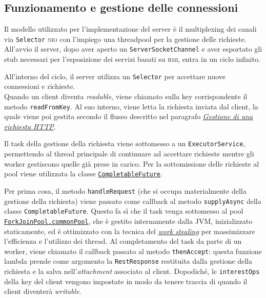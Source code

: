 \documentclass[a4paper,8pt]{article} %
\def\code#1{\texttt{#1}}
\begin{document}
\subsection{Funzionamento e gestione delle connessioni}
Il modello utilizzato per l'implementazione del server è il multiplexing dei canali via \code{Selector} \textsc{nio} con l'impiego una threadpool per la gestione delle richieste.
All'avvio il server, dopo aver aperto un \code{ServerSocketChannel} e aver esportato gli stub necessari per l'esposizione dei servizi basati su \textsc{rmi},
entra in un ciclo infinito.
\par All'interno del ciclo, il server utilizza un \code{Selector} per accettare nuove connessioni e richieste.
\\ Quando un client diventa \emph{readable}, viene chiamato sulla key corrispondente il metodo \code{readFromKey}. Al suo interno, viene letta la richiesta inviata dal client,
la quale viene poi gestita secondo il flusso descritto nel paragrafo \hyperref[sec:http_flow]{\emph{Gestione di una richiesta HTTP}}.

\par Il task della gestione della richiesta viene sottomesso a un \code{ExecutorService}, permettendo al thread principale di continuare ad accettare richieste mentre gli worker gestiscono quelle già prese in carico.
Per la sottomissione delle richieste al pool viene utilizzata la classe \href{https://docs.oracle.com/javase/8/docs/api/java/util/concurrent/CompletableFuture.html}{\code{CompletableFuture}}.
\par Per prima cosa, il metodo \code{handleRequest} (che si occupa materialmente della gestione della richiesta) viene passato come callback al metodo \code{supplyAsync} della classe \code{CompletableFuture}.
Questo fa sì che il task venga sottomesso al pool \href{https://medium.com/swlh/the-unfairly-unknown-forkjoinpool-c262777def6a}{\code{ForkJoinPool.commonPool}}, che è gestito internamente dalla JVM, inizializzato staticamente, ed è ottimizzato con la tecnica del \href{https://en.wikipedia.org/wiki/Work_stealing}{\emph{work stealing}} per massimizzare l'efficienza e l'utilizzo dei thread.
Al completamento del task da parte di un worker, viene chiamato il callback passato al metodo \code{thenAccept}: questa funzione lambda prende come argomento la \code{RestResponse} restituita dalla gestione della richiesta e la salva nell'\emph{attachment} associato al client.
Dopodiché, le \code{interestOps} della key del client vengono impostate in modo da tenere traccia di quando il client diventerà \emph{writable}.
\end{document}
